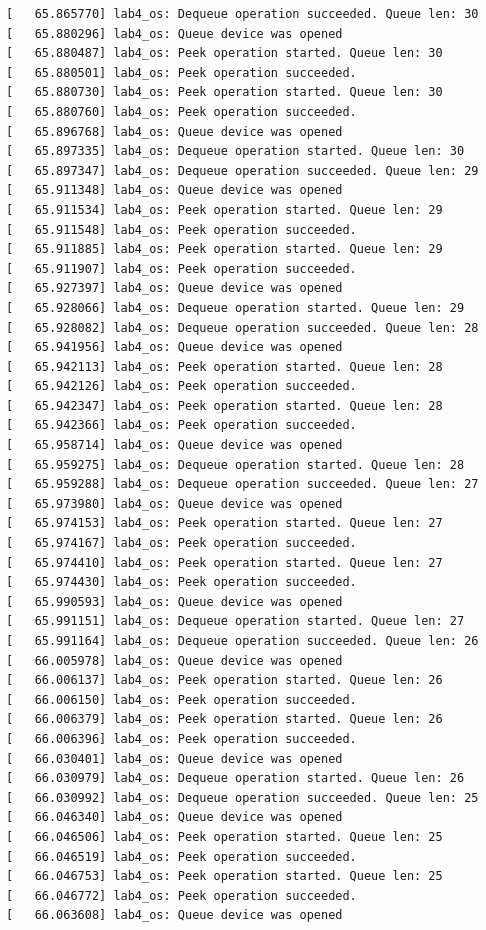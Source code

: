 \documentclass[a4paper,14pt]{extarticle}
\begin{document}
\begin{verbatim}
[   65.865770] lab4_os: Dequeue operation succeeded. Queue len: 30
[   65.880296] lab4_os: Queue device was opened
[   65.880487] lab4_os: Peek operation started. Queue len: 30
[   65.880501] lab4_os: Peek operation succeeded.
[   65.880730] lab4_os: Peek operation started. Queue len: 30
[   65.880760] lab4_os: Peek operation succeeded.
[   65.896768] lab4_os: Queue device was opened
[   65.897335] lab4_os: Dequeue operation started. Queue len: 30
[   65.897347] lab4_os: Dequeue operation succeeded. Queue len: 29
[   65.911348] lab4_os: Queue device was opened
[   65.911534] lab4_os: Peek operation started. Queue len: 29
[   65.911548] lab4_os: Peek operation succeeded.
[   65.911885] lab4_os: Peek operation started. Queue len: 29
[   65.911907] lab4_os: Peek operation succeeded.
[   65.927397] lab4_os: Queue device was opened
[   65.928066] lab4_os: Dequeue operation started. Queue len: 29
[   65.928082] lab4_os: Dequeue operation succeeded. Queue len: 28
[   65.941956] lab4_os: Queue device was opened
[   65.942113] lab4_os: Peek operation started. Queue len: 28
[   65.942126] lab4_os: Peek operation succeeded.
[   65.942347] lab4_os: Peek operation started. Queue len: 28
[   65.942366] lab4_os: Peek operation succeeded.
[   65.958714] lab4_os: Queue device was opened
[   65.959275] lab4_os: Dequeue operation started. Queue len: 28
[   65.959288] lab4_os: Dequeue operation succeeded. Queue len: 27
[   65.973980] lab4_os: Queue device was opened
[   65.974153] lab4_os: Peek operation started. Queue len: 27
[   65.974167] lab4_os: Peek operation succeeded.
[   65.974410] lab4_os: Peek operation started. Queue len: 27
[   65.974430] lab4_os: Peek operation succeeded.
[   65.990593] lab4_os: Queue device was opened
[   65.991151] lab4_os: Dequeue operation started. Queue len: 27
[   65.991164] lab4_os: Dequeue operation succeeded. Queue len: 26
[   66.005978] lab4_os: Queue device was opened
[   66.006137] lab4_os: Peek operation started. Queue len: 26
[   66.006150] lab4_os: Peek operation succeeded.
[   66.006379] lab4_os: Peek operation started. Queue len: 26
[   66.006396] lab4_os: Peek operation succeeded.
[   66.030401] lab4_os: Queue device was opened
[   66.030979] lab4_os: Dequeue operation started. Queue len: 26
[   66.030992] lab4_os: Dequeue operation succeeded. Queue len: 25
[   66.046340] lab4_os: Queue device was opened
[   66.046506] lab4_os: Peek operation started. Queue len: 25
[   66.046519] lab4_os: Peek operation succeeded.
[   66.046753] lab4_os: Peek operation started. Queue len: 25
[   66.046772] lab4_os: Peek operation succeeded.
[   66.063608] lab4_os: Queue device was opened

\end{verbatim}
\end{document}
